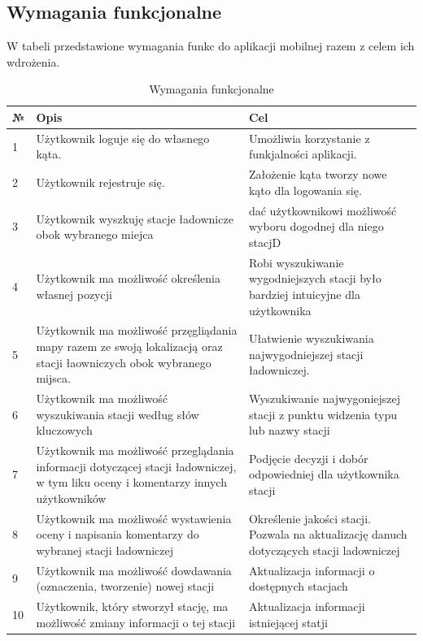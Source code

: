 \subsection{Wymagania funkcjonalne}
W tabeli przedstawione wymagania funkc do aplikacji mobilnej razem z celem ich wdrożenia.
\begin{table}[htb] \small
    \caption{Wymagania funkcjonalne}
    \begin{tabular}{| m{0.5cm} | m{7cm} | m{7cm} |} 
    \hline
    № & Opis & Cel \\
    \hline
    1 & Użytkownik loguje się do własnego kąta. & Umożliwia korzystanie z funkjalności aplikacji. \\ 
    \hline
    2 & Użytkownik rejestruje się. & Założenie kąta tworzy nowe kąto dla logowania się. \\ 
    \hline
    3 & Użytkownik wyszkuję stacje ładownicze obok wybranego miejca  & dać użytkownikowi możliwość wyboru dogodnej dla niego stacjD \\
    \hline
    4 & Użytkownik ma możliwość określenia własnej pozycji & Robi wyszukiwanie wygodniejszych stacji było bardziej intuicyjne dla użytkownika  \\
    \hline
    5 & Użytkownik ma możliwość przęgliądania mapy razem ze swoją lokalizacją oraz stacji łaowniczych obok wybranego mijsca. & Ułatwienie wyszukiwania najwygodniejszej stacji ładowniczej. \\
    \hline
    6 & Użytkownik ma możliwość wyszukiwania stacji według słów kluczowych & Wyszukiwanie najwygoniejszej stacji z punktu widzenia typu lub nazwy stacji \\
    \hline
    7 & Użytkownik ma możliwość przeglądania informacji dotyczącej stacji ładowniczej, w tym liku oceny i komentarzy innych użytkowników & Podjęcie decyzji i dobór odpowiedniej dla użytkownika stacji \\
    \hline
    8 & Użytkownik ma możliwość wystawienia oceny i napisania komentarzy do wybranej stacji ładowniczej & Określenie jakości stacji. Pozwala na aktualizację danuch dotyczących stacji ladowniczej \\
    \hline
    9 & Użytkownik ma możliwość dowdawania (oznaczenia, tworzenie) nowej stacji & Aktualizacja informacji o dostępnych stacjach \\
    \hline
    10 & Użytkownik, który stworzył stację, ma możliwość zmiany informacji o tej stacji & Aktualizacja informacji istniejącej statji \\
    \hline
\end{tabular}
\end{table}
\newpage

